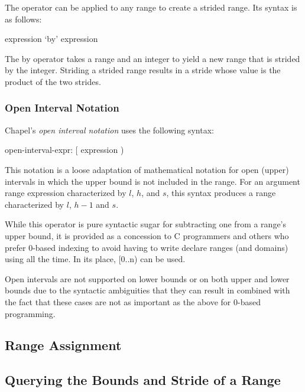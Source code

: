 The  operator can be applied to any range to create a strided
range.  Its syntax is as follows:

\begin{syntax}
expression `by' expression
\end{syntax}

The by operator takes a range and an integer to yield a new range that
is strided by the integer.  Striding a strided range results in a
stride whose value is the product of the two strides.

\subsubsection{Open Interval Notation}
\label{Open_Interval}

Chapel's \emph{open interval notation} uses the following syntax:

\begin{syntax}
open-interval-expr:
  [ expression )
\end{syntax}

This notation is a loose adaptation of mathematical notation for open
(upper) intervals in which the upper bound is not included in the
range.  For an argument range expression characterized by $l$, $h$,
and $s$, this syntax produces a range characterized by $l$, $h-1$ and
$s$.

\begin{rationale}
While this operator is pure syntactic sugar for subtracting one from a
range's upper bound, it is provided as a concession to C programmers
and others who prefer 0-based indexing to avoid having to write
declare ranges (and domains) using  all the time.  In its
place, [0..n) can be used.

Open intervals are not supported on lower bounds or on both upper and
lower bounds due to the syntactic ambiguities that they can result in
combined with the fact that these cases are not as important as the
above for 0-based programming.
\end{rationale}

\subsection{Range Assignment}
\label{Range_Assignment}

\subsection{Querying the Bounds and Stride of a Range}


